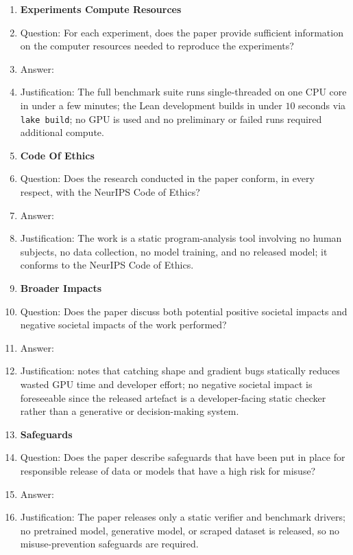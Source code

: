 \begin{enumerate}
\item {\bf Experiments Compute Resources}
    \item[] Question: For each experiment, does the paper provide sufficient information on the computer resources needed to reproduce the experiments?
    \item[] Answer: \answerYes{}
    \item[] Justification: The full benchmark suite runs single-threaded on one CPU core in under a few minutes; the Lean development builds in under $10$ seconds via \texttt{lake build}; no GPU is used and no preliminary or failed runs required additional compute.

\item {\bf Code Of Ethics}
    \item[] Question: Does the research conducted in the paper conform, in every respect, with the NeurIPS Code of Ethics?
    \item[] Answer: \answerYes{}
    \item[] Justification: The work is a static program-analysis tool involving no human subjects, no data collection, no model training, and no released model; it conforms to the NeurIPS Code of Ethics.

\item {\bf Broader Impacts}
    \item[] Question: Does the paper discuss both potential positive societal impacts and negative societal impacts of the work performed?
    \item[] Answer: \answerYes{}
    \item[] Justification:  notes that catching shape and gradient bugs statically reduces wasted GPU time and developer effort; no negative societal impact is foreseeable since the released artefact is a developer-facing static checker rather than a generative or decision-making system.

\item {\bf Safeguards}
    \item[] Question: Does the paper describe safeguards that have been put in place for responsible release of data or models that have a high risk for misuse?
    \item[] Answer: \answerNA{}
    \item[] Justification: The paper releases only a static verifier and benchmark drivers; no pretrained model, generative model, or scraped dataset is released, so no misuse-prevention safeguards are required.


\end{enumerate}
